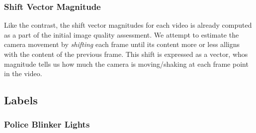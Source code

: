 \subsubsection{Shift Vector Magnitude}
%
Like the contrast, the shift vector magnitudes for each video is already computed as a part of the initial image quality assessment. We attempt to estimate the camera movement by \textit{shifting} each frame until its content more or less alligns with the content of the previous frame. This shift is expressed as a vector, whos magnitude tells us how much the camera is moving/shaking at each frame point in the video.
%
\subsection{Labels}
%

%
\subsubsection{Police Blinker Lights}\label{sec:police_detection}
%
